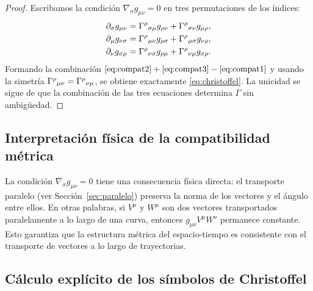 \begin{proof}
Escribamos la condición $\nabla_\sigma g_{\mu\nu} = 0$ en tres permutaciones de los índices:
\begin{align}
  \partial_\sigma g_{\mu\nu} &= \Gamma^{\rho}{}_{\sigma \mu}g_{\rho\nu} + \Gamma^{\rho}{}_{\sigma \nu}g_{\mu\rho}, \label{eq:compat1}\\
  \partial_\mu g_{\nu\sigma} &= \Gamma^{\rho}{}_{\mu \nu}g_{\rho\sigma} + \Gamma^{\rho}{}_{\mu \sigma}g_{\nu\rho}, \label{eq:compat2}\\
  \partial_\nu g_{\sigma\mu} &= \Gamma^{\rho}{}_{\nu \sigma}g_{\rho\mu} + \Gamma^{\rho}{}_{\nu \mu}g_{\sigma\rho}. \label{eq:compat3}
\end{align}
Formando la combinación $\eqref{eq:compat2} + \eqref{eq:compat3} - \eqref{eq:compat1}$ y usando la simetría $\Gamma^{\rho}{}_{\mu \nu} = \Gamma^{\rho}{}_{\nu \mu}$, se obtiene exactamente \eqref{eq:christoffel}. La unicidad se sigue de que la combinación de las tres ecuaciones determina $\Gamma$ sin ambigüedad.
\end{proof}

\subsection{Interpretación física de la compatibilidad métrica}

La condición $\nabla_\sigma g_{\mu\nu} = 0$ tiene una consecuencia física directa: el transporte paralelo (ver Sección~\ref{sec:paralelo}) preserva la norma de los vectores y el ángulo entre ellos. En otras palabras, si $V^\mu$ y $W^\mu$ son dos vectores transportados paralelamente a lo largo de una curva, entonces $g_{\mu\nu}V^\mu W^\nu$ permanece constante. Esto garantiza que la estructura métrica del espacio-tiempo es consistente con el transporte de vectores a lo largo de trayectorias.

\subsection{Cálculo explícito de los símbolos de Christoffel}

